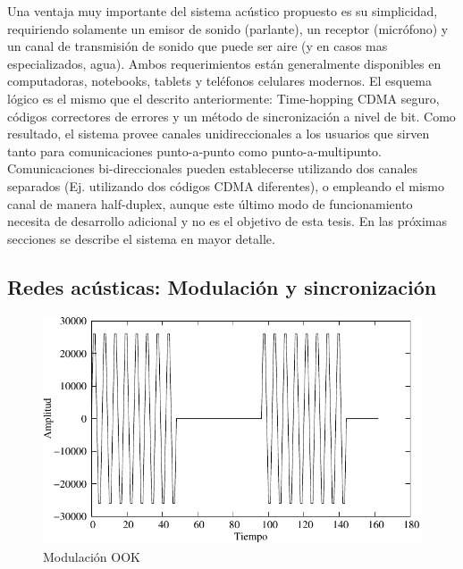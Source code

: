 Una ventaja muy importante del sistema acústico propuesto es su simplicidad, requiriendo solamente un emisor de sonido (parlante), un receptor (micrófono) y un canal de transmisión de sonido que puede ser aire (y en casos mas especializados, agua). Ambos requerimientos están generalmente disponibles en computadoras, notebooks, tablets y teléfonos celulares modernos. 
El esquema lógico es el mismo que el descrito anteriormente: Time-hopping CDMA seguro, códigos correctores de errores y un método de sincronización a nivel de bit.
Como resultado, el sistema provee canales unidireccionales a los usuarios que sirven tanto para comunicaciones punto-a-punto como punto-a-multipunto. Comunicaciones bi-direccionales pueden establecerse utilizando dos canales separados (Ej. utilizando dos códigos CDMA diferentes), o empleando el mismo canal de manera half-duplex, aunque este último modo de funcionamiento necesita de desarrollo adicional y no es el objetivo de esta tesis.
En las próximas secciones se describe el sistema en mayor detalle.

\subsection{Redes acústicas: Modulación y sincronización}
\begin{figure}[t]
  \centering
    \includegraphics[width=4.5in]{graphs/modulated.pdf}
    \caption{Modulación OOK}
    \label{arch:sync}
\end{figure}


